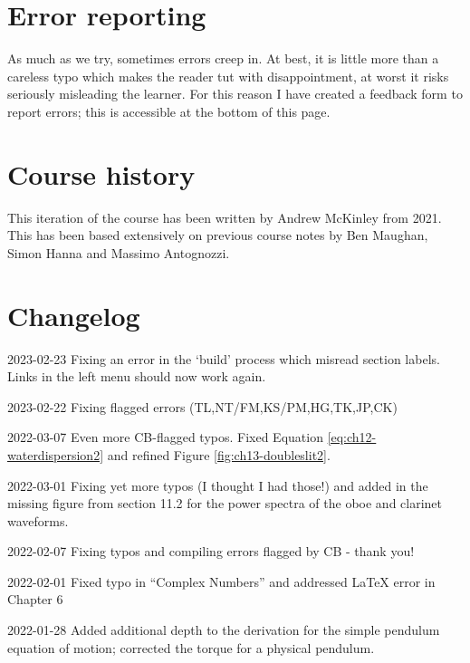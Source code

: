 \documentclass[
]{book}
\begin{document}
\hypertarget{error-reporting}{%
\section*{Error reporting}\label{error-reporting}}

As much as we try, sometimes errors creep in. At best, it is little more than a careless typo which makes the reader tut with disappointment, at worst it risks seriously misleading the learner. For this reason I have created a feedback form to report errors; this is accessible at the bottom of this page.

\hypertarget{course-history}{%
\section*{Course history}\label{course-history}}

This iteration of the course has been written by Andrew McKinley from 2021. This has been based extensively on previous course notes by Ben Maughan, Simon Hanna and Massimo Antognozzi.

\hypertarget{sec-changelog}{%
\section*{Changelog}\label{sec-changelog}}

2023-02-23 Fixing an error in the `build' process which misread section labels. Links in the left menu should now work again.

2023-02-22 Fixing flagged errors (TL,NT/FM,KS/PM,HG,TK,JP,CK)

2022-03-07 Even more CB-flagged typos. Fixed Equation \eqref{eq:ch12-waterdispersion2} and refined Figure \ref{fig:ch13-doubleslit2}.

2022-03-01 Fixing yet more typos (I thought I had those!) and added in the missing figure from section 11.2 for the power spectra of the oboe and clarinet waveforms.

2022-02-07 Fixing typos and compiling errors flagged by CB - thank you!

2022-02-01 Fixed typo in ``Complex Numbers'' and addressed LaTeX error in Chapter 6

2022-01-28 Added additional depth to the derivation for the simple pendulum equation of motion; corrected the torque for a physical pendulum.
\end{document}
